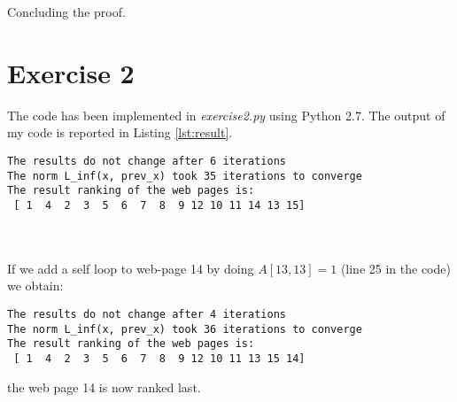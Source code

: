 \documentclass[12pt]{article}
\begin{document}
Concluding the proof.

\section*{Exercise 2}

The code has been implemented in \textit{exercise2.py} using Python 2.7. The output of my code is reported in Listing \ref{lst:result}.

\begin{lstlisting}[caption=Code output, label=lst:result]
The results do not change after 6 iterations
The norm L_inf(x, prev_x) took 35 iterations to converge
The result ranking of the web pages is: 
 [ 1  4  2  3  5  6  7  8  9 12 10 11 14 13 15]
\end{lstlisting}
\\
\\
If we add a self loop to web-page 14 by doing $A[13, 13] = 1$ (line 25 in the code) we obtain: 

\begin{lstlisting}[caption=Code output]
The results do not change after 4 iterations
The norm L_inf(x, prev_x) took 36 iterations to converge
The result ranking of the web pages is: 
 [ 1  4  2  3  5  6  7  8  9 12 10 11 13 15 14]
\end{lstlisting}

the web page 14 is now ranked last.
\end{document}
